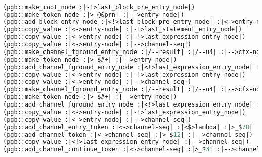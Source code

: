 \begin{lstlisting}[language = lisp, numbers = none, 
caption={Hypergraph Intermediate Representation},label={lst:figIR},
    basicstyle = \ttfamily\bfseries\scriptsize, linewidth = .9\linewidth] 

(pgb::make_root_node :|-!>last_block_pre_entry_node|)
(pgb::make_token_node :|>_@&prn| :|-->entry-node|)
(pgb::add_block_entry_node :|<!>last_block_pre_entry_node| :|<->entry-node|)
(pgb::copy_value :|<->entry-node| :|-!>last_statement_entry_node|)
(pgb::copy_value :|<->entry-node| :|-!>last_expression_entry_node|)
(pgb::copy_value :|<->entry-node| :|-->channel-seq|)
(pgb::make_channel_fground_entry_node :|/--result| :|/--u4| :|-->cfx-node|)
(pgb::make_token_node :|>_$#+| :|-->entry-node|)
(pgb::add_channel_fground_entry_node :|<!>last_expression_entry_node| :|<->entry-node| :|/--lambda| :|<->cfx-node|)
(pgb::copy_value :|<->entry-node| :|-!>last_expression_entry_node|)
(pgb::copy_value :|<->entry-node| :|-->channel-seq|)
(pgb::make_channel_fground_entry_node :|/--result| :|/--u4| :|-->cfx-node|)
(pgb::make_token_node :|>_$#+| :|-->entry-node|)
(pgb::add_channel_fground_entry_node :|<!>last_expression_entry_node| :|<->entry-node| :|/--lambda| :|<->cfx-node|)
(pgb::copy_value :|<->entry-node| :|-!>last_expression_entry_node|)
(pgb::copy_value :|<->entry-node| :|-->channel-seq|)
(pgb::add_channel_entry_token :|<->channel-seq| :|<$>lambda| :|>_$78| :|-->channel-seq|)
(pgb::add_channel_token :|<->channel-seq| :|>_$12| :|-->channel-seq|)
(pgb::copy_value :|<!>last_expression_entry_node| :|-->channel-seq|)
(pgb::add_channel_continue_token :|<->channel-seq| :|>_$3| :|-->channel-seq|)

\end{lstlisting}
